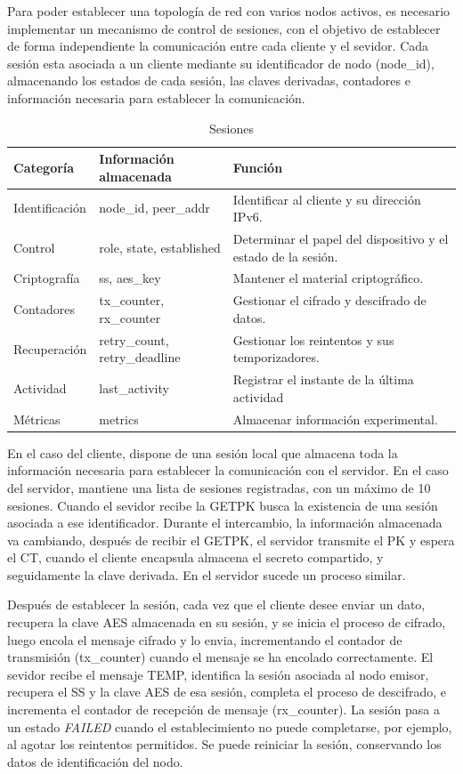 Para poder establecer una topología de red con varios nodos activos, es necesario implementar un mecanismo de control de sesiones, 
con el objetivo de establecer de forma independiente la comunicación entre cada cliente y el sevidor. 
Cada sesión esta asociada a un cliente mediante su identificador de nodo (node\_id), almacenando los estados de cada sesión, las claves derivadas, contadores e información necesaria para establecer la comunicación. 

\begin{table}[htbp]
  \centering
  \caption{Sesiones}
  \label{tab:tab_sesiones}
  \begin{tabularx}{\textwidth}{l l X}
    \hline
    Categoría & Información almacenada & Función \\
    \hline
    Identificación & node\_id, peer\_addr & Identificar al cliente y su dirección IPv6. \\
    Control & role, state, established & Determinar el papel del dispositivo y el estado de la sesión. \\
    Criptografía & ss, aes\_key & Mantener el material criptográfico. \\
    Contadores & tx\_counter, rx\_counter & Gestionar el cifrado y descifrado de datos. \\
    Recuperación & retry\_count, retry\_deadline & Gestionar los reintentos y sus temporizadores. \\
    Actividad & last\_activity & Registrar el instante de la última actividad \\
    Métricas & metrics & Almacenar información experimental. \\
    \hline
  \end{tabularx}
\end{table}

En el caso del cliente, dispone de una sesión local que almacena toda la información necesaria
para establecer la comunicación con el servidor. En el caso del servidor, mantiene una lista de sesiones registradas, 
con un máximo de 10 sesiones. Cuando el sevidor recibe la GETPK busca la existencia de una sesión asociada a ese identificador. 
Durante el intercambio, la información almacenada va cambiando, después de recibir el GETPK, el servidor transmite el PK y espera el CT,
cuando el cliente encapsula almacena el secreto compartido, y seguidamente la clave derivada. En el servidor sucede un proceso similar. 

Después de establecer la sesión, cada vez que el cliente desee enviar un dato, recupera la clave AES almacenada en su sesión, y se inicia el proceso de 
cifrado, luego encola el mensaje cifrado y lo envia, incrementando el contador de transmisión (tx\_counter) cuando el mensaje se ha encolado correctamente. El sevidor recibe el mensaje TEMP, 
identifica la sesión asociada al nodo emisor, recupera el SS y la clave AES de esa sesión, completa el proceso de descifrado, e incrementa el contador de 
recepción de mensaje (rx\_counter). La sesión pasa a un estado \textit{FAILED} cuando el establecimiento no puede completarse, por ejemplo, al agotar los reintentos
permitidos. Se puede reiniciar la sesión, conservando los datos de identificación del nodo. 

